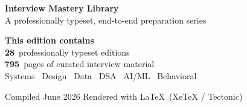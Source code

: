 \documentclass[11pt]{article}
\begin{document}
\makecoverpage

\thispagestyle{empty}
\vspace*{2.2cm}
\begin{center}
{\headingfont\Huge\bfseries\color{ink} Interview Mastery Library}\\[6pt]
{\headingfont\large\color{ink2} A professionally typeset, end-to-end preparation series}\\[26pt]
\begin{tcolorbox}[enhanced,width=0.82\linewidth,colback=acc!6,colframe=acc,
  boxrule=0pt,leftrule=4pt,arc=3pt,left=16pt,right=16pt,top=12pt,bottom=12pt]
{\headingfont\large\color{ink}\bfseries This edition contains}\\[8pt]
{\Large\color{acc}\bfseries 28}~{\color{ink2}professionally typeset editions}\\[4pt]
{\Large\color{acc}\bfseries 795}~{\color{ink2}pages of curated interview material}\\[4pt]
{\color{ink2} Systems \textbullet\ Design \textbullet\ Data \textbullet\ DSA \textbullet\ AI/ML \textbullet\ Behavioral}
\end{tcolorbox}
\end{center}
\vfill
\begin{center}{\color{ink2}\small Compiled June 2026 \quad\textbullet\quad Rendered with \LaTeX\ (XeTeX / Tectonic)}\end{center}
\clearpage
\end{document}
